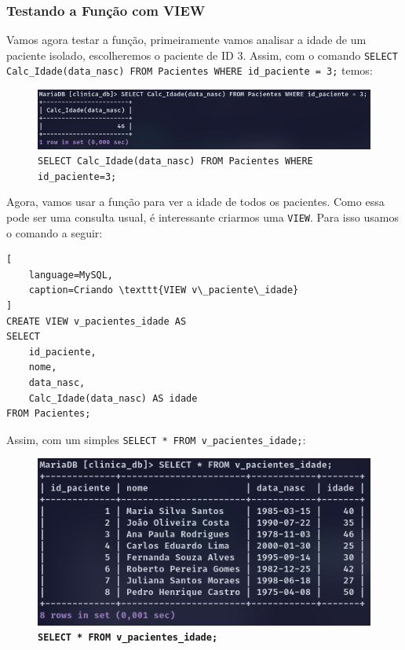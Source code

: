 \subsubsection{Testando a Função com VIEW}
Vamos agora testar a função, primeiramente vamos analisar a idade de um paciente isolado, escolheremos o paciente de ID 3. Assim, com o comando \texttt{SELECT Calc\_Idade(data\_nasc) FROM Pacientes WHERE id\_paciente = 3;} temos:

\begin{figure}[H]
    \centering
    \includegraphics[width=1\linewidth]{Text//Proc/idade_3.png}
    \caption{\texttt{SELECT Calc\_Idade(data\_nasc) FROM Pacientes WHERE id\_paciente=3;}}
    \label{fig:placeholder}
\end{figure}

Agora, vamos usar a função para ver a idade de todos os pacientes. Como essa pode ser uma consulta usual, é interessante criarmos uma \texttt{VIEW}. Para isso usamos o comando a seguir:

\begin{lstlisting}[
    language=MySQL,
    caption=Criando \texttt{VIEW v\_paciente\_idade}
]
CREATE VIEW v_pacientes_idade AS
SELECT 
    id_paciente,
    nome,
    data_nasc,
    Calc_Idade(data_nasc) AS idade
FROM Pacientes;    
\end{lstlisting}

Assim, com um simples \texttt{SELECT * FROM v\_pacientes\_idade;}:

\begin{figure}[H]
    \centering
    \includegraphics[width=0.75\linewidth]{Text//Proc/idade_table.png}
    \caption{\textbf{\texttt{SELECT * FROM v\_pacientes\_idade;}}}
\end{figure}


